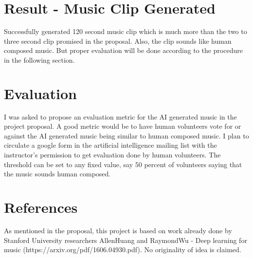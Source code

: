\documentclass[conference]{IEEEtran}
\begin{document}
\section{Result - Music Clip Generated}
Successfully generated 120 second music clip which is much more than the two to three second clip promised in the proposal. Also, the clip sounds like human composed music. But proper evaluation will be done according to the procedure in the following section.

\section{Evaluation}
I was asked to propose an evaluation metric for the AI generated music in the project proposal. A good metric would be to have human volunteers vote for or against the AI generated music being similar to human composed music. I plan to circulate a google form in the artificial intelligence mailing list with the instructor's permission to get evaluation done by human volunteers. The threshold can be set to any fixed value, say 50 percent of volunteers saying that the music sounds human composed.

\section{References}
As mentioned in the proposal, this project is based on work already done by Stanford University researchers AllenHuang and RaymondWu - 
Deep learning for music (https://arxiv.org/pdf/1606.04930.pdf). No originality of idea is claimed. 
\end{document}
